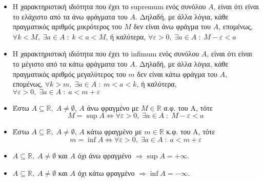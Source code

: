 \begin{rem}
\item {}
    \begin{itemize}[label=\textcolor{Col1}{\tiny$\blacksquare$}]
        \item 
    Η χαρακτηριστική ιδιότητα που έχει το supremum ενός συνόλου $ A $, είναι
    ότι είναι το ελάχιστο από τα άνω φράγματα του $A$. Δηλαδή, με άλλα λόγια,
    κάθε πραγματικός αριθμός μικρότερος του $M$ δεν είναι άνω φράγμα του 
    $A$, επομένως, $ \forall k < M, \; \exists a \in A \; : \; k < a < M $, 
    ή καλύτερα, $ \forall \varepsilon > 0, \; \exists a \in A \; : \; 
    M- \varepsilon < a$

\item 
    Η χαρακτηριστική ιδιότητα που έχει το infimum ενός συνόλου $ A $, είναι
    ότι είναι το μέγιστο από τα κάτω φράγματα του $A$. Δηλαδή, με άλλα λόγια,
    κάθε πραγματικός αριθμός μεγαλύτερος του $m$ δεν είναι κάτω φράγμα του 
    $A$, επομένως, $ \forall k > m, \; \exists a \in A \; : \; m < a < k $, 
    ή καλύτερα, $ \forall \varepsilon > 0, \; \exists a \in A \; : \; 
    a < m + \varepsilon $
    \end{itemize}
\end{rem}
\begin{thm}[\textcolor{Col2}{Χαρακτηριστική ιδιότητα του sup και inf}]
\item {}
    \begin{itemize}[label=\textcolor{Col1}{\tiny$\blacksquare$}]
        \item Έστω $ A \subseteq \mathbb{R}, \; A \neq \emptyset $, $ A $ άνω φραγμένο με $M \in \mathbb{R}$ α.φ. του A, τότε 
    \[
         M = \sup A \Leftrightarrow \forall \varepsilon > 0, \; \exists 
         a \in A \; : \; M- \varepsilon  < a
     \] 

 \item Έστω $ A \subseteq \mathbb{R}, \; A \neq \emptyset $, $ A $ κάτω
    φραγμένο με $m \in \mathbb{R}$ κ.φ. του A, τότε 
    \[
         m = \inf A \Leftrightarrow \forall \varepsilon > 0, \; \exists 
         a \in A \; : \; a < m+ \varepsilon 
     \] 
    \end{itemize}
    \end{thm}

\begin{prop}
        \item {}
    \begin{itemize}[label=\textcolor{Col1}{\tiny$\blacksquare$}]
        \item $ A \subseteq \mathbb{R}, \; A \neq \emptyset $ και $A$ όχι 
            άνω φραγμένο $ \Rightarrow \sup A = + \infty $.
        \item $ A \subseteq \mathbb{R}, \; A \neq \emptyset $ και $A$ όχι 
            κάτω φραγμένο $ \Rightarrow \inf A = - \infty $.
    \end{itemize}

    

\end{prop}


